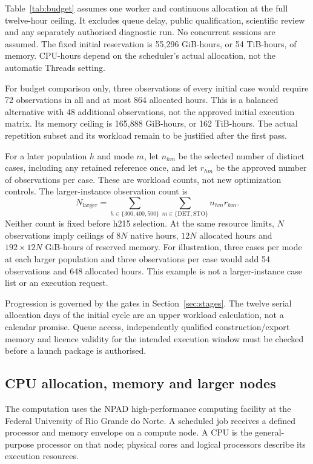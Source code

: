 \documentclass[11pt,a4paper]{article}
\begin{document}
Table~\ref{tab:budget} assumes one worker and continuous allocation at the full twelve-hour ceiling. It excludes queue delay, public qualification, scientific review and any separately authorised diagnostic run. No concurrent sessions are assumed. The fixed initial reservation is 55,296 GiB-hours, or 54 TiB-hours, of memory. CPU-hours depend on the scheduler's actual allocation, not the automatic Threads setting.

For budget comparison only, three observations of every initial case would require 72 observations in all and at most 864 allocated hours. This is a balanced alternative with 48 additional observations, not the approved initial execution matrix. Its memory ceiling is 165,888 GiB-hours, or 162 TiB-hours. The actual repetition subset and its workload remain to be justified after the first pass.

For a later population $h$ and mode $m$, let $n_{hm}$ be the selected number of distinct cases, including any retained reference once, and let $r_{hm}$ be the approved number of observations per case. These are workload counts, not new optimization controls. The larger-instance observation count is
\begin{equation}
 N_{\mathrm{larger}}=\sum_{h\in\{300,400,500\}}
                    \sum_{m\in\{\mathrm{DET},\mathrm{STO}\}}n_{hm}r_{hm}.
 \label{eq:largerbudget}
\end{equation}
Neither count is fixed before h215 selection. At the same resource limits, $N$ observations imply ceilings of $8N$ native hours, $12N$ allocated hours and $192\times12N$ GiB-hours of reserved memory. For illustration, three cases per mode at each larger population and three observations per case would add 54 observations and 648 allocated hours. This example is not a larger-instance case list or an execution request.

Progression is governed by the gates in Section~\ref{sec:stages}. The twelve serial allocation days of the initial cycle are an upper workload calculation, not a calendar promise. Queue access, independently qualified construction/export memory and licence validity for the intended execution window must be checked before a launch package is authorised.

\subsection{CPU allocation, memory and larger nodes}

The computation uses the NPAD high-performance computing facility at the Federal University of Rio Grande do Norte. A scheduled job receives a defined processor and memory envelope on a compute node. A CPU is the general-purpose processor on that node; physical cores and logical processors describe its execution resources.
\end{document}
